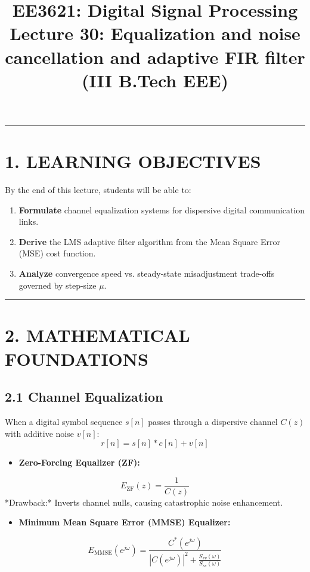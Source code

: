 \documentclass[11pt,a4paper]{article}
\begin{document}
\title{\textbf{EE3621: Digital Signal Processing} \\ \Large Lecture 30: Equalization and noise cancellation and adaptive FIR filter \\ \large (III B.Tech EEE)}\maketitle

\noindent\rule{\textwidth}{0.5pt}
\section*{1. LEARNING OBJECTIVES}
By the end of this lecture, students will be able to:
\begin{enumerate}
\item \textbf{Formulate} channel equalization systems for dispersive digital communication links.
\item \textbf{Derive} the LMS adaptive filter algorithm from the Mean Square Error (MSE) cost function.
\item \textbf{Analyze} convergence speed vs. steady-state misadjustment trade-offs governed by step-size $\mu$.
\end{enumerate}

\noindent\rule{\textwidth}{0.5pt}
\section*{2. MATHEMATICAL FOUNDATIONS}

\subsection*{2.1 Channel Equalization}
When a digital symbol sequence $s[n]$ passes through a dispersive channel $C(z)$ with additive noise $v[n]$:
$$ r[n] = s[n] * c[n] + v[n] $$
\begin{itemize}
\item \textbf{Zero-Forcing Equalizer (ZF):}
\end{itemize}
  $$ E_{\text{ZF}}(z) = \frac{1}{C(z)} $$
  *Drawback:* Inverts channel nulls, causing catastrophic noise enhancement.
\begin{itemize}
\item \textbf{Minimum Mean Square Error (MMSE) Equalizer:}
\end{itemize}
  $$ E_{\text{MMSE}}(e^{j\omega}) = \frac{C^*(e^{j\omega})}{|C(e^{j\omega})|^2 + \frac{S_{vv}(\omega)}{S_{ss}(\omega)}} $$
\end{document}
